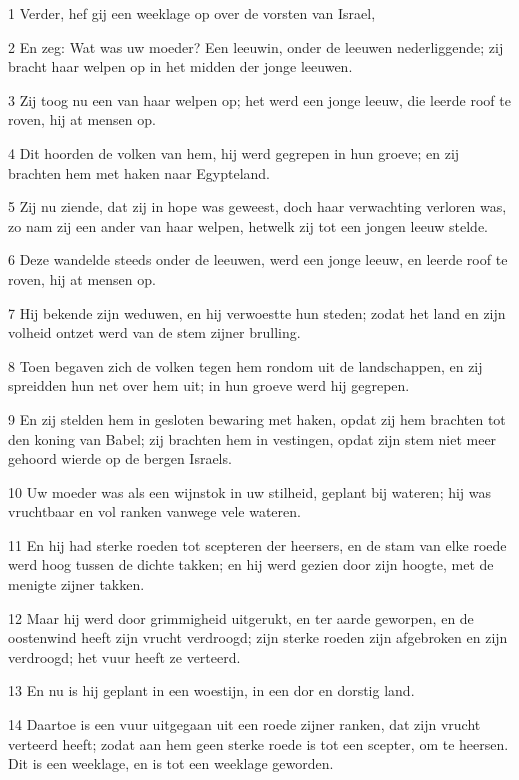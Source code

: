 \par 1 Verder, hef gij een weeklage op over de vorsten van Israel,
\par 2 En zeg: Wat was uw moeder? Een leeuwin, onder de leeuwen nederliggende; zij bracht haar welpen op in het midden der jonge leeuwen.
\par 3 Zij toog nu een van haar welpen op; het werd een jonge leeuw, die leerde roof te roven, hij at mensen op.
\par 4 Dit hoorden de volken van hem, hij werd gegrepen in hun groeve; en zij brachten hem met haken naar Egypteland.
\par 5 Zij nu ziende, dat zij in hope was geweest, doch haar verwachting verloren was, zo nam zij een ander van haar welpen, hetwelk zij tot een jongen leeuw stelde.
\par 6 Deze wandelde steeds onder de leeuwen, werd een jonge leeuw, en leerde roof te roven, hij at mensen op.
\par 7 Hij bekende zijn weduwen, en hij verwoestte hun steden; zodat het land en zijn volheid ontzet werd van de stem zijner brulling.
\par 8 Toen begaven zich de volken tegen hem rondom uit de landschappen, en zij spreidden hun net over hem uit; in hun groeve werd hij gegrepen.
\par 9 En zij stelden hem in gesloten bewaring met haken, opdat zij hem brachten tot den koning van Babel; zij brachten hem in vestingen, opdat zijn stem niet meer gehoord wierde op de bergen Israels.
\par 10 Uw moeder was als een wijnstok in uw stilheid, geplant bij wateren; hij was vruchtbaar en vol ranken vanwege vele wateren.
\par 11 En hij had sterke roeden tot scepteren der heersers, en de stam van elke roede werd hoog tussen de dichte takken; en hij werd gezien door zijn hoogte, met de menigte zijner takken.
\par 12 Maar hij werd door grimmigheid uitgerukt, en ter aarde geworpen, en de oostenwind heeft zijn vrucht verdroogd; zijn sterke roeden zijn afgebroken en zijn verdroogd; het vuur heeft ze verteerd.
\par 13 En nu is hij geplant in een woestijn, in een dor en dorstig land.
\par 14 Daartoe is een vuur uitgegaan uit een roede zijner ranken, dat zijn vrucht verteerd heeft; zodat aan hem geen sterke roede is tot een scepter, om te heersen. Dit is een weeklage, en is tot een weeklage geworden.

